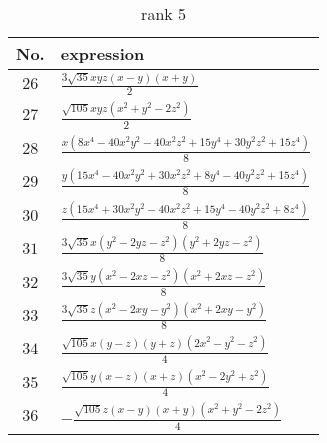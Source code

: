 \documentclass[fleqn,8pt,landscape]{jsarticle}
\begin{document}
\begin{table}[ht!]
\begin{center}
\caption{rank 5}
\renewcommand{\arraystretch}{1.3}
\begin{tabular}{cl} \hline \hline
No. & expression \\ \hline
$ 26 $ & $ \frac{3 \sqrt{35} x y z \left(x - y\right) \left(x + y\right)}{2} $ \\
$ 27 $ & $ \frac{\sqrt{105} x y z \left(x^{2} + y^{2} - 2 z^{2}\right)}{2} $ \\
$ 28 $ & $ \frac{x \left(8 x^{4} - 40 x^{2} y^{2} - 40 x^{2} z^{2} + 15 y^{4} + 30 y^{2} z^{2} + 15 z^{4}\right)}{8} $ \\
$ 29 $ & $ \frac{y \left(15 x^{4} - 40 x^{2} y^{2} + 30 x^{2} z^{2} + 8 y^{4} - 40 y^{2} z^{2} + 15 z^{4}\right)}{8} $ \\
$ 30 $ & $ \frac{z \left(15 x^{4} + 30 x^{2} y^{2} - 40 x^{2} z^{2} + 15 y^{4} - 40 y^{2} z^{2} + 8 z^{4}\right)}{8} $ \\
$ 31 $ & $ \frac{3 \sqrt{35} x \left(y^{2} - 2 y z - z^{2}\right) \left(y^{2} + 2 y z - z^{2}\right)}{8} $ \\
$ 32 $ & $ \frac{3 \sqrt{35} y \left(x^{2} - 2 x z - z^{2}\right) \left(x^{2} + 2 x z - z^{2}\right)}{8} $ \\
$ 33 $ & $ \frac{3 \sqrt{35} z \left(x^{2} - 2 x y - y^{2}\right) \left(x^{2} + 2 x y - y^{2}\right)}{8} $ \\
$ 34 $ & $ \frac{\sqrt{105} x \left(y - z\right) \left(y + z\right) \left(2 x^{2} - y^{2} - z^{2}\right)}{4} $ \\
$ 35 $ & $ \frac{\sqrt{105} y \left(x - z\right) \left(x + z\right) \left(x^{2} - 2 y^{2} + z^{2}\right)}{4} $ \\
$ 36 $ & $ - \frac{\sqrt{105} z \left(x - y\right) \left(x + y\right) \left(x^{2} + y^{2} - 2 z^{2}\right)}{4} $ \\
 \hline \hline
\end{tabular}
\end{center}
\end{table}
\end{document}
